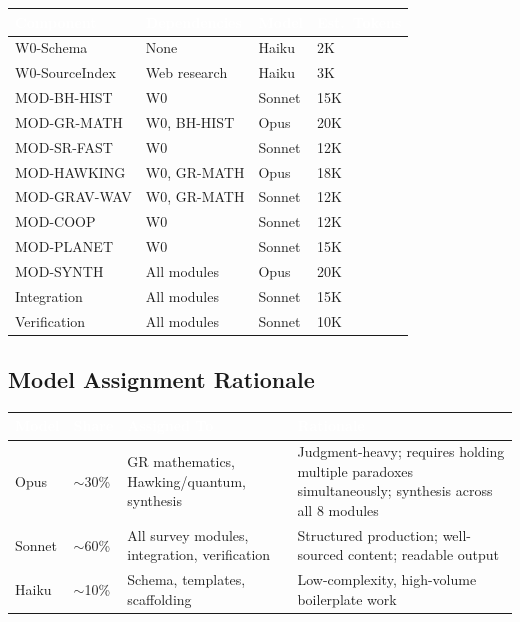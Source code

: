 \documentclass[11pt,letterpaper]{article}
\newcommand{\tableheader}[1]{\textbf{\sffamily\textcolor{white}{#1}}}
\begin{document}
\begin{center}
\begin{tabularx}{\textwidth}{L{3cm}L{3cm}C{1.5cm}C{2cm}}
\toprule
{}
\tableheader{Component} & \tableheader{Dependencies} & \tableheader{Model} & \tableheader{Est.\ Tokens} \\
\midrule
W0-Schema & None & Haiku & 2K \\
W0-SourceIndex & Web research & Haiku & 3K \\
MOD-BH-HIST & W0 & Sonnet & 15K \\
MOD-GR-MATH & W0, BH-HIST & Opus & 20K \\
MOD-SR-FAST & W0 & Sonnet & 12K \\
MOD-HAWKING & W0, GR-MATH & Opus & 18K \\
MOD-GRAV-WAV & W0, GR-MATH & Sonnet & 12K \\
MOD-COOP & W0 & Sonnet & 12K \\
MOD-PLANET & W0 & Sonnet & 15K \\
MOD-SYNTH & All modules & Opus & 20K \\
Integration & All modules & Sonnet & 15K \\
Verification & All modules & Sonnet & 10K \\
\bottomrule
\end{tabularx}
\end{center}

\subsection{Model Assignment Rationale}

\begin{center}
\begin{tabularx}{\textwidth}{L{2cm}C{1.5cm}XC{2.5cm}}
\toprule
{}
\tableheader{Model} & \tableheader{Share} & \tableheader{Assigned To} & \tableheader{Rationale} \\
\midrule
Opus & $\sim$30\% & GR mathematics, Hawking/quantum, synthesis & Judgment-heavy; requires holding multiple paradoxes simultaneously; synthesis across all 8 modules \\
Sonnet & $\sim$60\% & All survey modules, integration, verification & Structured production; well-sourced content; readable output \\
Haiku & $\sim$10\% & Schema, templates, scaffolding & Low-complexity, high-volume boilerplate work \\
\bottomrule
\end{tabularx}
\end{center}
\end{document}
